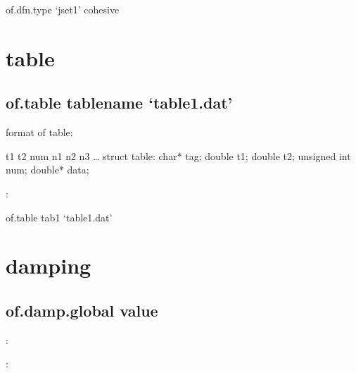 \documentclass[letterpaper,10pt,english]{sphinxmanual}
\begin{document}
\begin{sphinxVerbatim}[commandchars=\\\{\}]
of.dfn.type ‘jset1’ cohesive
\end{sphinxVerbatim}


\chapter{table}
\label{\detokenize{rst_tutorials/command_line_guide:table}}

\section{of.table tablename ‘table1.dat’}
\label{\detokenize{rst_tutorials/command_line_guide:of-table-tablename-table1-dat}}
format of table:

\begin{sphinxVerbatim}[commandchars=\\\{\}]
t1 t2 num
n1 n2 n3 …
struct table:
\PYGZob{}char\PYGZbs{}* tag;
double t1;
double t2;
unsigned int num;
double\PYGZbs{}* data;\PYGZcb{}
\end{sphinxVerbatim}

:

\begin{sphinxVerbatim}[commandchars=\\\{\}]
of.table tab1 ‘table1.dat’
\end{sphinxVerbatim}


\chapter{damping}
\label{\detokenize{rst_tutorials/command_line_guide:damping}}

\section{of.damp.global value}
\label{\detokenize{rst_tutorials/command_line_guide:of-damp-global-value}}
:

\begin{sphinxVerbatim}[commandchars=\\\{\}]
 
\end{sphinxVerbatim}

:

\begin{sphinxVerbatim}[commandchars=\\\{\}]
   
  
  
\end{sphinxVerbatim}
\end{document}
